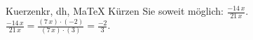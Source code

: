 \begin{MAufgabe}{Kuerzen}{kr, dh, MaTeX}
K\"urzen Sie soweit m\"oglich: $\frac{- 14\, x}{21\, x}$.\\ 
\ifLsg\MLoesung
\quad $\frac{- 14\, x}{21\, x}=\frac{(7\, x)\cdot(-2)}{(7\, x)\cdot(3)}=\frac{-2}{3}$.\else\relax\fi
 \end{MAufgabe}